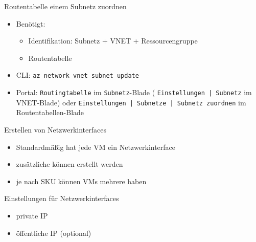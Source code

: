 \begin{flashcard}[Definition]{Routentabelle einem Subnetz zuordnen}
    \begin{itemize}
        \item Benötigt:
            \begin{itemize}
                \item Identifikation: Subnetz + VNET + Ressourcengruppe
                \item Routentabelle
            \end{itemize}
        \item CLI: \texttt{az network vnet subnet update}
        \item Portal: \texttt{Routingtabelle} im \texttt{Subnetz}-Blade ( \texttt{Einstellungen | Subnetz} im VNET-Blade) \newline
            oder \newline
            \texttt{Einstellungen | Subnetze | Subnetz zuordnen} im Routentabellen-Blade
    \end{itemize}
\end{flashcard}


\begin{flashcard}[Definition]{Erstellen von Netzwerkinterfaces}
    \begin{itemize}
        \item Standardmäßig hat jede VM ein Netzwerkinterface
        \item zusätzliche können erstellt werden
        \item je nach SKU können VMs mehrere haben
    \end{itemize}
\end{flashcard}

\begin{flashcard}[Definition]{Einstellungen für Netzwerkinterfaces}
    \begin{itemize}
        \item private IP
        \item öffentliche IP (optional)
    \end{itemize}
\end{flashcard}

